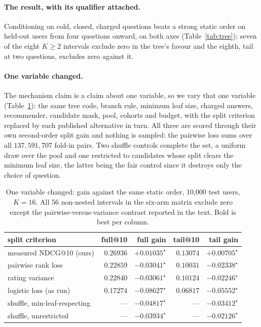 \documentclass[runningheads]{llncs}
\begin{document}
\paragraph{The result, with its qualifier attached.}
Conditioning on cold, closed, charged questions beats a strong static order on held-out users from
four questions onward, on both axes (Table~\ref{tab:tree}); seven of the eight $K\ge2$ intervals
exclude zero in the tree's favour and the eighth, tail at two questions, excludes zero against it.

\paragraph{One variable changed.}
The mechanism claim is a claim about one variable, so we vary that one variable
(Table~\ref{tab:splitcrit}): the same tree code, branch rule, minimum leaf size, charged answers,
recommender, candidate mask, pool, cohorts and budget, with the split criterion replaced by each
published alternative in turn. All three are scored through their own second-order split gain and nothing is sampled: the
pairwise loss sums over all $137{,}591{,}707$ fold-in pairs. Two shuffle controls complete the
set, a uniform draw over the pool and one restricted to candidates whose split clears the minimum
leaf size, the latter being the fair control since it destroys only the choice of question.

\begin{table}[tbp]
\centering
\caption{One variable changed: gain against the same static order, 10{,}000 test users, $K{=}16$. All
56 non-nested intervals in the six-arm matrix exclude zero except the pairwise-versus-variance
contrast reported in the text. Bold is best per column.}
\label{tab:splitcrit}
\small
\begin{tabular}{lrrrr}
\toprule
split criterion & full@10 & full gain & tail@10 & tail gain \\
\midrule
measured NDCG@10 (ours) & $\mathbf{0.26936}$ & $\mathbf{+0.01035}^\star$ & $\mathbf{0.13074}$ & $\mathbf{+0.00705}^\star$ \\
pairwise rank loss~\cite{hu2013interview} & $0.22859$ & $-0.03041^\star$ & $0.10031$ & $-0.02338^\star$ \\
rating variance~\cite{golbandi2011adaptive} & $0.22840$ & $-0.03061^\star$ & $0.10124$ & $-0.02246^\star$ \\
logistic loss (as run)~\cite{hu2013interview} & $0.17274$ & $-0.08627^\star$ & $0.06817$ & $-0.05552^\star$ \\
\midrule
shuffle, min-leaf-respecting & --- & $-0.04817^\star$ & --- & $-0.03412^\star$ \\
shuffle, unrestricted & --- & $-0.03934^\star$ & --- & $-0.02126^\star$ \\
\bottomrule
\end{tabular}
\end{table}
\end{document}
